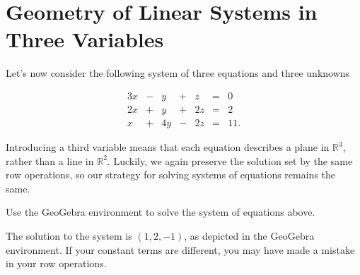 \documentclass{ximera}
\begin{document}
\begin{itemize}
                  \begin{center}
                  \end{center}
                  \end{itemize}
  
    \section*{Geometry of Linear Systems in Three Variables}
    Let's now consider the following  system of three equations and three unknowns

    $$\begin{array}{ccccccc}
        3x & -&y&+&z&= &0 \\
        2x& +&y&+&2z&=&2\\
        x& +&4y&-&2z&=&11.
    \end{array}$$

    Introducing a third variable means that each equation describes a plane in $\mathbb{R}^3$, rather than a line in $\mathbb{R}^2$.  Luckily, we again preserve the solution set by the same row operations, so our strategy for solving systems of equations remains the same.

    \begin{example}

        Use the GeoGebra environment to solve the system of equations above. 


        \begin{remark}

            The solution to the system is $(1,2,-1)$, as depicted in the GeoGebra environment. If your constant terms are different, you may have made a mistake in your row operations.

        \end{remark}
    \end{example}
\end{document}
